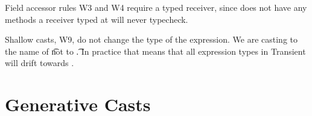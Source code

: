 \documentclass[a4paper,UKenglish,final]{lipics}
\begin{document}
Field accessor rules W3 and W4 require a typed receiver, since \any does
not have any methods a receiver typed at \any will never typecheck.

Shallow casts, W9, do not change the type of the expression. We are casting
to the name of \t not to \t.  In practice that means that all expression
types in Transient will drift towards \any.

\hrulefill

\begin{mathpar}











\end{mathpar}

\section{Generative Casts}
\end{document}
